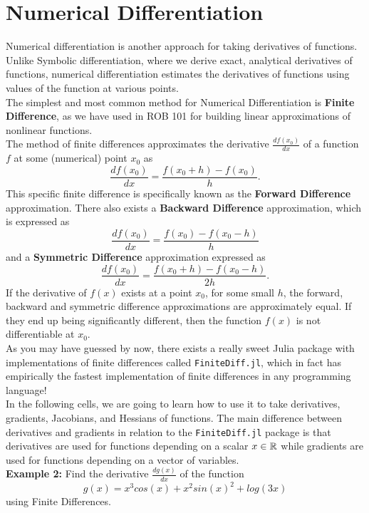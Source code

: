 \section{Numerical Differentiation}

Numerical differentiation is another approach for taking derivatives of functions. Unlike Symbolic differentiation, where we derive exact, analytical derivatives of functions, numerical differentiation estimates the derivatives of functions using values of the function at various points. \\

The simplest and most common method for Numerical Differentiation is \textbf{Finite Difference}, as we have used in ROB 101 for building linear approximations of nonlinear functions.\\

The method of finite differences approximates the derivative $\frac{d f(x_0)}{d x}$ of a function $f$ at some (numerical) point $x_0$ as $$\frac{d f(x_0)}{d x} = \frac{f(x_0+h) - f(x_0)}{h}.$$ This specific finite difference is specifically known as the \textbf{Forward Difference} approximation. There also exists a \textbf{Backward Difference} approximation, which is expressed as $$\frac{d f(x_0)}{d x} = \frac{f(x_0) - f(x_0-h)}{h}$$ and a \textbf{Symmetric Difference} approximation expressed as $$\frac{d f(x_0)}{d x} = \frac{f(x_0+h) - f(x_0-h)}{2h}.$$ If the derivative of $f(x)$ exists at a point $x_0$, for some small $h$, the forward, backward and symmetric difference approximations are approximately equal. If they end up being significantly different, then the function $f(x)$ is not differentiable at $x_0$.\\

As you may have guessed by now, there exists a really sweet Julia package with implementations of finite differences called \texttt{FiniteDiff.jl}, which in fact has empirically the fastest implementation of finite differences in any programming language! \\

In the following cells, we are going to learn how to use it to take derivatives, gradients, Jacobians, and Hessians of functions. The main difference between derivatives and gradients in relation to the \texttt{FiniteDiff.jl} package is that derivatives are used for functions depending on a scalar $x\in \mathbb R$ while gradients are used for functions depending on a vector of variables.\\

\textbf{Example 2:} Find the derivative $\frac{d g(x)}{d x}$ of the function 
$$g(x) = x^3cos(x) + x^2sin(x)^2 + log(3x)$$ using Finite Differences.

